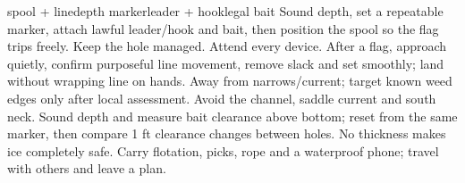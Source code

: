 
{{spool + line}{depth marker}{leader + hook}{legal bait}}
{Sound depth, set a repeatable marker, attach lawful leader/hook and bait, then
position the spool so the flag trips freely. Keep the hole managed.}
{Attend every device. After a flag, approach quietly, confirm purposeful line
movement, remove slack and set smoothly; land without wrapping line on hands.}
{Away from narrows/current; target known weed edges only after local assessment.}
{Avoid the channel, saddle current and south neck.}
{Sound depth and measure bait clearance above bottom; reset from the same
marker, then compare 1 ft clearance changes between holes.}
{No thickness makes ice completely safe. Carry flotation, picks, rope and a
waterproof phone; travel with others and leave a plan.}
